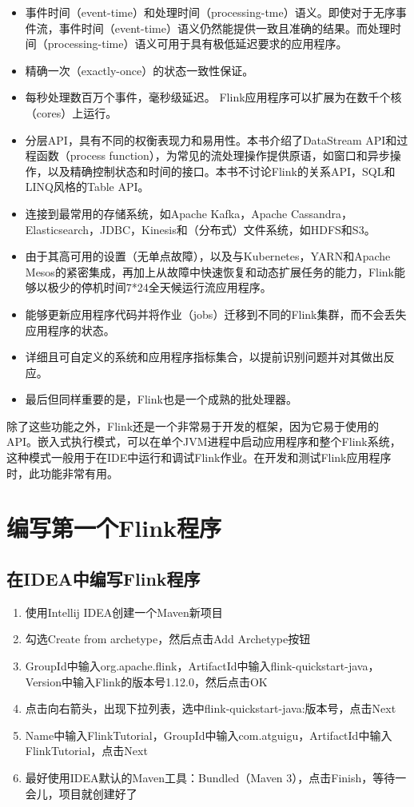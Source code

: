\documentclass[cn,11pt,chinese]{elegantbook}
\begin{document}
\begin{itemize}
    \item 事件时间（event-time）和处理时间（processing-tme）语义。即使对于无序事件流，事件时间（event-time）语义仍然能提供一致且准确的结果。而处理时间（processing-time）语义可用于具有极低延迟要求的应用程序。
    \item 精确一次（exactly-once）的状态一致性保证。
    \item 每秒处理数百万个事件，毫秒级延迟。 Flink应用程序可以扩展为在数千个核（cores）上运行。
    \item 分层API，具有不同的权衡表现力和易用性。本书介绍了DataStream API和过程函数（process function），为常见的流处理操作提供原语，如窗口和异步操作，以及精确控制状态和时间的接口。本书不讨论Flink的关系API，SQL和LINQ风格的Table API。
    \item 连接到最常用的存储系统，如Apache Kafka，Apache Cassandra，Elasticsearch，JDBC，Kinesis和（分布式）文件系统，如HDFS和S3。
    \item 由于其高可用的设置（无单点故障），以及与Kubernetes，YARN和Apache Mesos的紧密集成，再加上从故障中快速恢复和动态扩展任务的能力，Flink能够以极少的停机时间7*24全天候运行流应用程序。
    \item 能够更新应用程序代码并将作业（jobs）迁移到不同的Flink集群，而不会丢失应用程序的状态。
    \item 详细且可自定义的系统和应用程序指标集合，以提前识别问题并对其做出反应。
    \item 最后但同样重要的是，Flink也是一个成熟的批处理器。
\end{itemize}

除了这些功能之外，Flink还是一个非常易于开发的框架，因为它易于使用的API。嵌入式执行模式，可以在单个JVM进程中启动应用程序和整个Flink系统，这种模式一般用于在IDE中运行和调试Flink作业。在开发和测试Flink应用程序时，此功能非常有用。

\section{编写第一个Flink程序}

\subsection{在IDEA中编写Flink程序}

\begin{enumerate}
    \item 使用Intellij IDEA创建一个Maven新项目
    \item 勾选Create from archetype，然后点击Add Archetype按钮
    \item GroupId中输入org.apache.flink，ArtifactId中输入flink-quickstart-java，Version中输入Flink的版本号1.12.0，然后点击OK
    \item 点击向右箭头，出现下拉列表，选中flink-quickstart-java:版本号，点击Next
    \item Name中输入FlinkTutorial，GroupId中输入com.atguigu，ArtifactId中输入FlinkTutorial，点击Next
    \item 最好使用IDEA默认的Maven工具：Bundled（Maven 3），点击Finish，等待一会儿，项目就创建好了
\end{enumerate}
\end{document}
